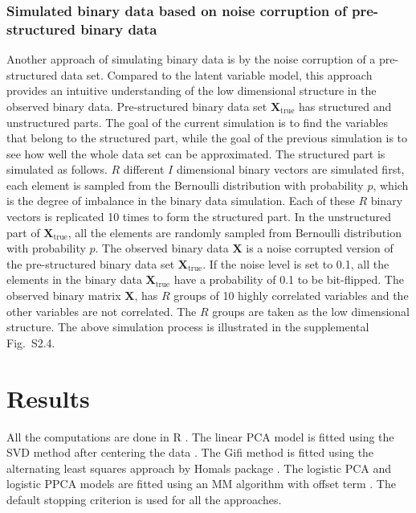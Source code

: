 \subsubsection{Simulated binary data based on noise corruption of pre-structured binary data}
Another approach of simulating binary data is by the noise corruption of a pre-structured data set. Compared to the latent variable model, this approach provides an intuitive understanding of the low dimensional structure in the observed binary data. Pre-structured binary data set $\mathbf{X}_{\text{true}}$ has structured and unstructured parts. The goal of the current simulation is to find the variables that belong to the structured part, while the goal of the previous simulation is to see how well the whole data set can be approximated. The structured part is simulated as follows. $R$ different $I$ dimensional binary vectors are simulated first, each element is sampled from the Bernoulli distribution with probability $p$, which is the degree of imbalance in the binary data simulation. Each of these $R$ binary vectors is replicated 10 times to form the structured part. In the unstructured part of $\mathbf{X}_{\text{true}}$, all the elements are randomly sampled from Bernoulli distribution with probability $p$. The observed binary data $\mathbf{X}$ is a noise corrupted version of the pre-structured binary data set $\mathbf{X}_{\text{true}}$. If the noise level is set to 0.1, all the elements in the binary data $\mathbf{X}_{\text{true}}$ have a probability of 0.1 to be bit-flipped. The observed binary matrix $\mathbf{X}$, has $R$ groups of 10 highly correlated variables and the other variables are not correlated. The $R$ groups are taken as the low dimensional structure. The above simulation process is illustrated in the supplemental Fig.~S2.4.\\

\section{Results}
All the computations are done in R \cite{RProject}. The linear PCA model is fitted using the SVD method after centering the data \cite{stacklies2007pcamethods}. The Gifi method is fitted using the alternating least squares approach by Homals package \cite{de2009gifi}. The logistic PCA and logistic PPCA models are fitted using an MM algorithm with offset term \cite{de2006principal, landgraf2015generalized}. The default stopping criterion is used for all the approaches.

